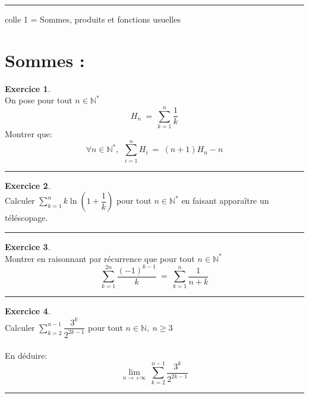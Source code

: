 \documentclass[10pt,a4paper]{article}
\newcommand{\N}{\mathbb{N}}
\theoremstyle{definition}
\theoremstyle{definition}
\newtheorem{exo}{Exercice}
\begin{document}
	
	\rule[0.5ex]{\textwidth}{0.1mm}	
	
	\begin{center}
		\Large \sc colle 1 = Sommes, produits et fonctions usuelles	
	\end{center}
\section*{Sommes :}

\begin{center}
\begin{minipage}[t]{0.45\linewidth}
\raggedright
\begin{exo}\quad\\
On pose pour tout $n\in\N^*$ 
$$ H_n  \ = \ \sum_{k=1}^{n} \dfrac{1}{k}$$
Montrer que:  
$$\forall n\in\N^* , \  \ \sum_{i=1}^{n} H_i  \ = \ (n+1)H_n - n$$
\end{exo}
\begin{center}
\rule{1\linewidth}{0.6pt}
\end{center}

\begin{exo}\quad\\ 
Calculer $\sum\limits_{k=1}^{n} k \ln\left(1+\dfrac{1}{k}\right)$ pour tout     $n\in\N^*$ en faisant apparaître un téléscopage.
\end{exo}

\begin{center}
\rule{1\linewidth}{0.6pt}
\end{center}
\end{minipage}	
\hfill\vrule\hfill
\begin{minipage}[t]{0.45\linewidth}
\raggedright

\begin{exo}\quad\\
Montrer en raisonnant par récurrence que pour tout $ n\in\N^*$
$$\sum\limits_{k=1}^{2n} \dfrac{(-1)^{k-1}}{k} \ = \ \sum\limits_{k=1}^{n} \dfrac{1}{n+k} $$
\end{exo}
\begin{center}
\rule{1\linewidth}{0.6pt}
\end{center}
\begin{exo}\quad\\ 

Calculer $\sum\limits_{k=2}^{n-1} \dfrac{3^k}{2^{2k-1}}$ pour tout     $n\in\N,~n\geq 3$\\ \quad\\

En déduire:  
$$\lim\limits_{n \rightarrow +\infty} ~\sum\limits_{k=2}^{n-1} \dfrac{3^k}{2^{2k-1}} $$
\end{exo}
\begin{center}
\rule{1\linewidth}{0.6pt}
\end{center}


	\end{minipage}
\end{center}
\end{document}
